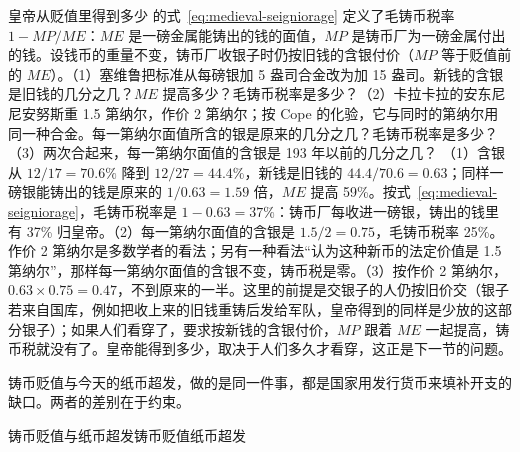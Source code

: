 \begin{example}{皇帝从贬值里得到多少}\label{ex:greek-seign}
的式~\eqref{eq:medieval-seigniorage} 定义了毛铸币税率 $1-MP/ME$：$ME$ 是一磅金属能铸出的钱的面值，$MP$ 是铸币厂为一磅金属付出的钱。设钱币的重量不变，铸币厂收银子时仍按旧钱的含银付价（$MP$ 等于贬值前的 $ME$）。（1）塞维鲁把标准从每磅银加 5 盎司合金改为加 15 盎司。新钱的含银是旧钱的几分之几？$ME$ 提高多少？毛铸币税率是多少？（2）卡拉卡拉的安东尼尼安努斯重 1.5 第纳尔，作价 2 第纳尔；按 Cope 的化验，它与同时的第纳尔用同一种合金\cite{cope1974}。每一第纳尔面值所含的银是原来的几分之几？毛铸币税率是多少？（3）两次合起来，每一第纳尔面值的含银是 193 年以前的几分之几？
\solution （1）含银从 $12/17=70.6\%$ 降到 $12/27=44.4\%$，新钱是旧钱的 $44.4/70.6=0.63$；同样一磅银能铸出的钱是原来的 $1/0.63=1.59$ 倍，$ME$ 提高 59\%。按式~\eqref{eq:medieval-seigniorage}，毛铸币税率是 $1-0.63=37\%$：铸币厂每收进一磅银，铸出的钱里有 37\% 归皇帝。（2）每一第纳尔面值的含银是 $1.5/2=0.75$，毛铸币税率 25\%。作价 2 第纳尔是多数学者的看法；另有一种看法“认为这种新币的法定价值是 1.5 第纳尔”\cite{haklai2011}，那样每一第纳尔面值的含银不变，铸币税是零。（3）按作价 2 第纳尔，$0.63\times0.75=0.47$，不到原来的一半。这里的前提是交银子的人仍按旧价交（银子若来自国库，例如把收上来的旧钱重铸后发给军队，皇帝得到的同样是少放的这部分银子）；如果人们看穿了，要求按新钱的含银付价，$MP$ 跟着 $ME$ 一起提高，铸币税就没有了。皇帝能得到多少，取决于人们多久才看穿，这正是下一节的问题。
\end{example}

铸币贬值与今天的纸币超发，做的是同一件事，都是国家用发行货币来填补开支的缺口。两者的差别在于约束。

\begin{compare}{铸币贬值与纸币超发}{铸币贬值}{纸币超发}
\end{compare}

